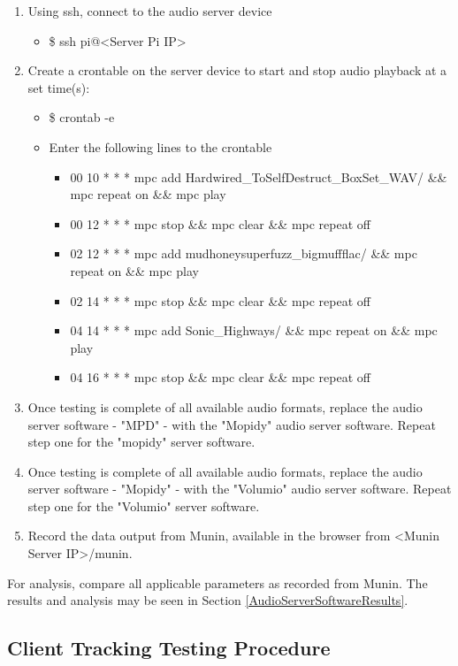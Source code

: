 \documentclass[11pt,a4paper,headinclude=false,footinclude=false]{scrreprt}
\begin{document}
\begin{enumerate}
  \item Using ssh, connect to the audio server device
  \begin{itemize}
    \item \$ ssh pi@<Server Pi IP>
  \end{itemize}
  \item Create a crontable on the server device to start and stop audio playback
  at a set time(s):
  \begin{itemize}
    \item \$ crontab -e
    \item Enter the following lines to the crontable
    \begin{itemize}
     \item 00 10 * * * mpc add Hardwired\_To\textendash{}Self\textendash{}Destruct\_BoxSet\_WAV/ \&\& mpc repeat on \&\& mpc play
     \item 00 12 * * * mpc stop \&\& mpc clear \&\& mpc repeat off
     \item 02 12 * * * mpc add
     mudhoney\textendash{}superfuzz\_bigmuff\textendash{}flac/ \&\& mpc repeat on \&\& mpc play
     \item 02 14 * * * mpc stop \&\& mpc clear \&\& mpc repeat off
     \item 04 14 * * * mpc add Sonic\_Highways/ \&\& mpc repeat on \&\& mpc play
     \item 04 16 * * * mpc stop \&\& mpc clear \&\& mpc repeat off
   \end{itemize}
  \end{itemize}
  \item Once testing is complete of all available audio formats, replace the audio
   server software - "MPD" - with the "Mopidy" audio server software. Repeat step
   one for the "mopidy" server software.
  \item Once testing is complete of all available audio formats, replace the audio
   server software - "Mopidy" - with the "Volumio" audio server software. Repeat
   step one for the "Volumio" server software.
  \item Record the data output from Munin, available in the browser from <Munin
  Server IP>/munin.
\end{enumerate}

For analysis, compare all applicable parameters as recorded from Munin.
The results and analysis may be seen in Section
\ref{AudioServerSoftwareResults}.

\subsection{Client Tracking Testing
Procedure}\label{client-tracking-testing-procedure}
\end{document}
